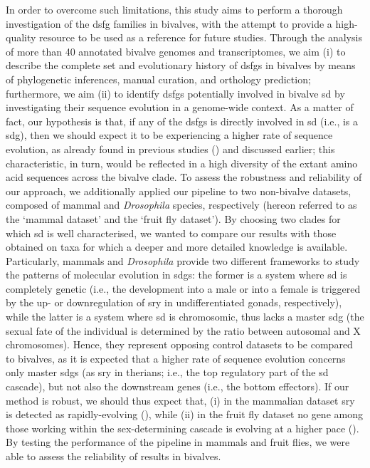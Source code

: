 In order to overcome such limitations, this study aims to perform a thorough investigation of the \gls{dsfg} families in bivalves, with the attempt to provide a high-quality resource to be used as a reference for future studies. Through the analysis of more than 40 annotated bivalve genomes and transcriptomes, we aim (i) to describe the complete set and evolutionary history of \glspl{dsfg} in bivalves by means of phylogenetic inferences, manual curation, and orthology prediction; furthermore, we aim (ii) to identify \glspl{dsfg} potentially involved in bivalve \gls{sd} by investigating their sequence evolution in a genome-wide context. As a matter of fact, our hypothesis is that, if any of the \glspl{dsfg} is directly involved in \gls{sd} (i.e., is a \gls{sdg}), then we should expect it to be experiencing a higher rate of sequence evolution, as already found in previous studies () and discussed earlier; this characteristic, in turn, would be reflected in a high diversity of the extant amino acid sequences across the bivalve clade. To assess the robustness and reliability of our approach, we additionally applied our pipeline to two non-bivalve datasets, composed of mammal and \textit{Drosophila} species, respectively (hereon referred to as the ‘mammal dataset’ and the ‘fruit fly dataset’). By choosing two clades for which \gls{sd} is well characterised, we wanted to compare our results with those obtained on taxa for which a deeper and more detailed knowledge is available. Particularly, mammals and \textit{Drosophila} provide two different frameworks to study the patterns of molecular evolution in \glspl{sdg}: the former is a system where \gls{sd} is completely genetic (i.e., the development into a male or into a female is triggered by the up- or downregulation of \gls{sry} in undifferentiated gonads, respectively), while the latter is a system where \gls{sd} is chromosomic, thus lacks a master \gls{sdg} (the sexual fate of the individual is determined by the ratio between autosomal and X chromosomes). Hence, they represent opposing control datasets to be compared to bivalves, as it is expected that a higher rate of sequence evolution concerns only master \glspl{sdg} (as \gls{sry} in therians; i.e., the top regulatory part of the \gls{sd} cascade), but not also the downstream genes (i.e., the bottom effectors). If our method is robust, we should thus expect that, (i) in the mammalian dataset \gls{sry} is detected as rapidly-evolving (), while (ii) in the fruit fly dataset no gene among those working within the sex-determining cascade is evolving at a higher pace (). By testing the performance of the pipeline in mammals and fruit flies, we were able to assess the reliability of results in bivalves.

